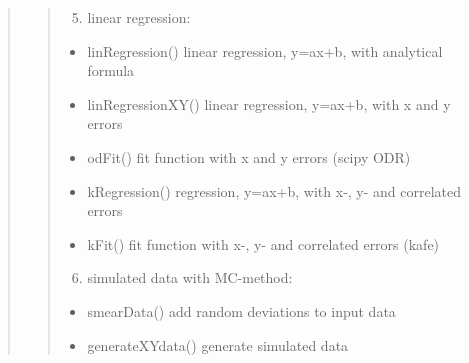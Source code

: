 \documentclass[letterpaper,10pt,english]{sphinxmanual}
\begin{document}
\begin{quote}
\begin{quote}
\begin{itemize}
\end{itemize}
\begin{enumerate}
\setcounter{enumi}{4}
\item {} 
linear regression:

\end{enumerate}
\begin{itemize}
\item {} 
linRegression()    linear regression, y=ax+b, with analytical formula

\item {} 
linRegressionXY()  linear regression, y=ax+b, with x and y errors 

\item {} 
odFit()            fit function with x and y errors (scipy ODR)

\item {} 
kRegression()      regression, y=ax+b, with x-, y- and correlated errors

\item {} 
kFit()             fit function with x-, y- and correlated errors (kafe)

\end{itemize}
\begin{enumerate}
\setcounter{enumi}{5}
\item {} 
simulated data with MC-method:

\end{enumerate}
\begin{itemize}
\item {} 
smearData()          add random deviations to input data

\item {} 
generateXYdata()     generate simulated data

\end{itemize}
\end{quote}
\end{quote}
\end{document}
